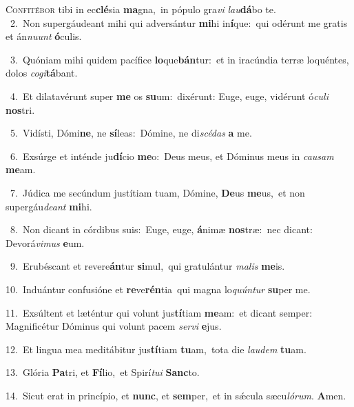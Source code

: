 \lettrine{\initial\textcolor{\initialcolor}{C}}{onfitébor} tibi in ec\-\textbf{clé}\-sia \textbf{ma}\-gna,~\star in pópulo gra\textit{vi} \textit{lau}\-\textbf{dá}bo te.\\
{\numbfont\textcolor{\numbcolor}{~2.}}~Non supergáudeant mihi qui adversántur \textbf{mi}\-hi in\-\textbf{í}\-que:~\star qui odérunt me gratis et án\-\textit{nu}\-\textit{unt} \textbf{ó}\-culis.\par
{\numbfont\textcolor{\numbcolor}{~3.}}~Quóniam mihi quidem pacífice \textbf{lo}\-que\-\textbf{bán}\-tur:~\star et in iracúndia terræ loquéntes, dolos \textit{co}\-\textit{gi}\textbf{tá}bant.\par
{\numbfont\textcolor{\numbcolor}{~4.}}~Et dilatavérunt super \textbf{me} os \textbf{su}\-um:~\star dixérunt: Euge, euge, vidérunt ó\-\textit{cu}\-\textit{li} \textbf{nos}\-tri.\par
{\numbfont\textcolor{\numbcolor}{~5.}}~Vidísti, Dómi\-\textbf{ne}\-, ne \textbf{sí}\-leas:~\star Dómine, ne di\-\textit{scé}\-\textit{das} \textbf{a} me.\par
{\numbfont\textcolor{\numbcolor}{~6.}}~Exsúrge et inténde ju\-\textbf{dí}\-cio \textbf{me}\-o:~\star Deus meus, et Dóminus meus in \textit{cau}\-\textit{sam} \textbf{me}\-am.\par
{\numbfont\textcolor{\numbcolor}{~7.}}~Júdica me secúndum justítiam tuam, Dómine, \textbf{De}\-us \textbf{me}\-us,~\star et non supergáu\-\textit{de}\-\textit{ant} \textbf{mi}\-hi.\par
{\numbfont\textcolor{\numbcolor}{~8.}}~Non dicant in córdibus suis:~\dagger Euge, euge, \textbf{á}\-nimæ \textbf{nos}\-træ:~\star nec dicant: Devorá\-\textit{vi}\-\textit{mus} \textbf{e}\-um.\par
{\numbfont\textcolor{\numbcolor}{~9.}}~Erubéscant et revere\-\textbf{án}\-tur \textbf{si}\-mul,~\star qui gratulántur \textit{ma}\-\textit{lis} \textbf{me}\-is.\par
{\numbfont\textcolor{\numbcolor}{10.}}~Induántur confusióne et \textbf{re}\-ve\-\textbf{rén}\-tia~\star qui magna lo\-\textit{quún}\-\textit{tur} \textbf{su}\-per me.\par
{\numbfont\textcolor{\numbcolor}{11.}}~Exsúltent et læténtur qui volunt jus\-\textbf{tí}\-tiam \textbf{me}\-am:~\star et dicant semper: Magnificétur Dóminus qui volunt pacem \textit{ser}\-\textit{vi} \textbf{e}\-jus.\par
{\numbfont\textcolor{\numbcolor}{12.}}~Et lingua mea meditábitur jus\-\textbf{tí}\-tiam \textbf{tu}\-am,~\star tota die \textit{lau}\-\textit{dem} \textbf{tu}\-am.\par
{\numbfont\textcolor{\numbcolor}{13.}}~Glória \textbf{Pa}\-tri, et \textbf{Fí}\-lio,~\star et Spirí\-\textit{tu}\-\textit{i} \textbf{Sanc}\-to.\par
{\numbfont\textcolor{\numbcolor}{14.}}~Sicut erat in princípio, et \textbf{nunc}\-, et \textbf{sem}\-per,~\star et in sǽcula sæcu\-\textit{ló}\-\textit{rum}. \textbf{A}\-men.\par
